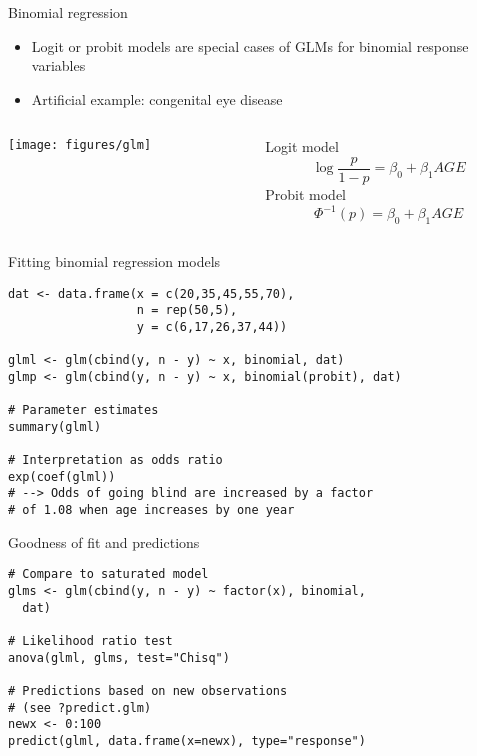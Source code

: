 \documentclass{beamer}
\begin{document}
\begin{frame}{Binomial regression}
  \begin{itemize}
    \item Logit or probit models are special cases of GLMs for binomial
      response variables
    \item Artificial example: congenital eye disease
  \end{itemize}
\begin{columns}[c]
\begin{column}{6cm}
  \texttt{[image: figures/glm]}
\end{column}
\begin{column}{5cm}
Logit model
\[
  \log\frac{p}{1 - p} = \beta_0 + \beta_1 AGE
\]
Probit model
\[
  \Phi^{-1}(p) = \beta_0 + \beta_1 AGE
\]
\end{column}
\end{columns}
\end{frame}

{

\begin{frame}[fragile]{Fitting binomial regression models}
\begin{lstlisting}
dat <- data.frame(x = c(20,35,45,55,70), 
                  n = rep(50,5),
                  y = c(6,17,26,37,44))

glml <- glm(cbind(y, n - y) ~ x, binomial, dat)
glmp <- glm(cbind(y, n - y) ~ x, binomial(probit), dat)

# Parameter estimates
summary(glml)

# Interpretation as odds ratio
exp(coef(glml))
# --> Odds of going blind are increased by a factor
# of 1.08 when age increases by one year
\end{lstlisting}
\end{frame}

\begin{frame}[fragile]{Goodness of fit and predictions}
\begin{lstlisting}
# Compare to saturated model
glms <- glm(cbind(y, n - y) ~ factor(x), binomial,
  dat)

# Likelihood ratio test
anova(glml, glms, test="Chisq")

# Predictions based on new observations
# (see ?predict.glm)
newx <- 0:100
predict(glml, data.frame(x=newx), type="response")
\end{lstlisting}
\end{frame}

}
\end{document}
